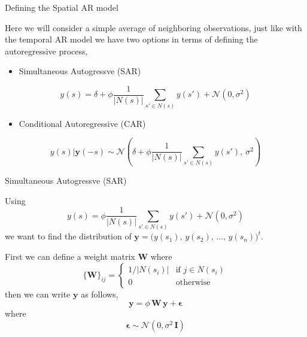 \documentclass[11pt,ignorenonframetext,]{beamer}
\providecommand{\tightlist}{%
  \setlength{\itemsep}{0pt}\setlength{\parskip}{0pt}}
\begin{document}
\begin{frame}[t]{Defining the Spatial AR model}
\protect\hypertarget{defining-the-spatial-ar-model}{}

Here we will consider a simple average of neighboring observations, just
like with the temporal AR model we have two options in terms of defining
the autoregressive process,

\pause

\begin{itemize}
\tightlist
\item
  Simultaneous Autogressve (SAR)
\end{itemize}

\[ y(s) = \delta + \phi \frac{1}{|N(s)|}\sum_{s' \in N(s)} y(s') + \mathcal{N}(0,\sigma^2) \]

\pause

\begin{itemize}
\tightlist
\item
  Conditional Autoregressive (CAR)
\end{itemize}

\[ y(s)|\symbf{y}(-s) \sim \mathcal{N}\left(\delta + \phi \frac{1}{|N(s)|}\sum_{s' \in N(s)} y(s'),~ \sigma^2 \right) \]

\end{frame}

\begin{frame}[t]{Simultaneous Autogressve (SAR)}
\protect\hypertarget{simultaneous-autogressve-sar}{}

\vspace{-3mm}

Using
\[ y(s) = \phi \frac{1}{|N(s)|}\sum_{s' \in N(s)} y(s') + \mathcal{N}(0,\sigma^2) \]
we want to find the distribution of
\(\symbf{y} = \Big(y(s_1),\, y(s_2),\,\ldots,\,y(s_n)\Big)^t\).

\pause

\vspace{5mm}

First we can define a weight matrix \(\symbf{W}\) where \[ 
\{\symbf{W}\}_{ij} = \begin{cases}
1/|N(s_i)| & \text{if $j \in N(s_i)$} \\
0        & \text{otherwise}
\end{cases}
\] then we can write \(\symbf{y}\) as follows,
\[ \symbf{y} = \phi \, \symbf{W} \, \symbf{y} + \symbf{\epsilon} \]
where \[ \symbf{\epsilon} \sim \mathcal{N}(0,\sigma^2 \, \symbf{I}) \]

\end{frame}
\end{document}
